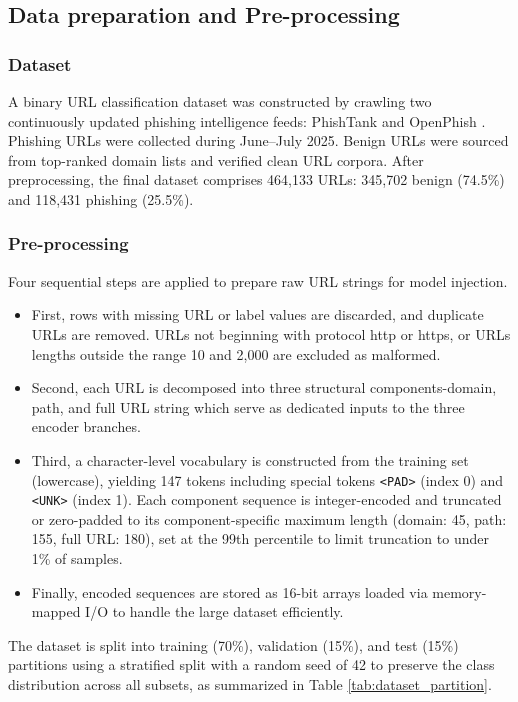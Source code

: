 \documentclass[conference]{IEEEtran}
\begin{document}
\subsection{Data preparation and Pre-processing}
\subsubsection{\textbf{Dataset}}
A binary URL classification dataset was constructed by crawling two continuously updated phishing intelligence feeds: PhishTank \cite{phishtank} and OpenPhish \cite{openphish}. Phishing URLs were collected during June--July 2025. Benign URLs were sourced from top-ranked domain lists and verified clean URL corpora. After preprocessing, the final dataset comprises 464,133 URLs: 345,702 benign (74.5\%) and 118,431 phishing (25.5\%).

\subsubsection{\textbf{Pre-processing}}
Four sequential steps are applied to prepare raw URL strings for model injection.

\begin{itemize}
\item First, rows with missing URL or label values are discarded, and duplicate URLs are removed. URLs not beginning with protocol http or https, or URLs lengths outside the range 10 and 2,000 are excluded as malformed.
\item Second, each URL is decomposed into three structural components-domain, path, and full URL string which serve as dedicated inputs to the three encoder branches.
\item Third, a character-level vocabulary is constructed from the training set (lowercase), yielding 147 tokens including special tokens \texttt{<PAD>} (index 0) and \texttt{<UNK>} (index 1). Each component sequence is integer-encoded and truncated or zero-padded to its component-specific maximum length (domain: 45, path: 155, full URL: 180), set at the 99th percentile to limit truncation to under 1\% of samples.
\item Finally, encoded sequences are stored as 16-bit arrays loaded via memory-mapped I/O to handle the large dataset efficiently.
\end{itemize}


The dataset is split into training (70\%), validation (15\%), and test (15\%) partitions using a stratified split with a random seed of 42 to preserve the class distribution across all subsets, as summarized in Table \ref{tab:dataset_partition}.
\end{document}
